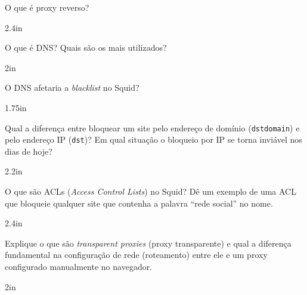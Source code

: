 \documentclass[12pt]{exam}
\begin{document}
	\begin{questions}
	\question O que é proxy reverso? 

	\begin{solutionbox}{2.4in} \end{solutionbox}

	\question O que é DNS? Quais são os mais utilizados?
	\begin{solutionbox}{2in} 		
		\end{solutionbox}

	\question O DNS afetaria a \textit{blacklist} no Squid?
	\begin{solutionbox}{1.75in} 		
		\end{solutionbox}
	\question Qual a diferença entre bloquear um site pelo endereço de domínio (\texttt{dstdomain}) e pelo endereço IP (\texttt{dst})? Em qual situação o bloqueio por IP se torna inviável nos dias de hoje?
    \begin{solutionbox}{2.2in} \end{solutionbox}

    \question O que são ACLs (\textit{Access Control Lists}) no Squid? Dê um exemplo de uma ACL que bloqueie qualquer site que contenha a palavra ``rede social'' no nome.
    \begin{solutionbox}{2.4in} \end{solutionbox}
    \question Explique o que são \textit{transparent proxies} (proxy transparente) e qual a diferença fundamental na configuração de rede (roteamento) entre ele e um proxy configurado manualmente no navegador.
    \begin{solutionbox}{2in} \end{solutionbox}
    
	

	\end{questions}
	
\end{document}
